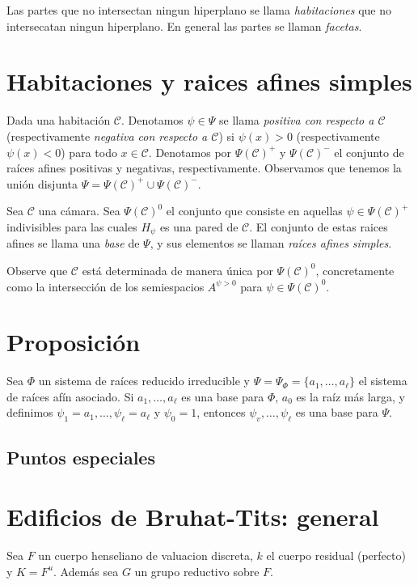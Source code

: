 \documentclass[oneside,12pt]{amsart}
\theoremstyle{definition}
\numberwithin{equation}{section}
\begin{document}
    
    Las partes que no intersectan ningun hiperplano se llama \emph{habitaciones} que no intersecatan ningun hiperplano. En general las partes se llaman \emph{facetas}.


\section{Habitaciones y raices afines simples}

Dada una habitación $\mathcal{C}$. Denotamos $\psi \in \Psi$ se llama \textit{positiva con respecto a $\mathcal C$} (respectivamente \textit{negativa con respecto a $\mathcal C$}) si $\psi(x) > 0$ (respectivamente $\psi(x) < 0$) para todo $x \in \mathcal{C}$. Denotamos por $\Psi(\mathcal{C})^+$ y $\Psi(\mathcal{C})^-$ el conjunto de raíces afines positivas y negativas, respectivamente. Observamos que tenemos la unión disjunta $\Psi = \Psi(\mathcal{C})^+ \cup \Psi(\mathcal{C})^-$.
   
 Sea $\mathcal{C}$ una cámara. Sea $\Psi(\mathcal{C})^0$ el conjunto que consiste en aquellas $\psi \in \Psi(\mathcal{C})^+$ indivisibles para las cuales $H_\psi$ es una pared de $\mathcal{C}$. El conjunto de estas raices afines se llama una \textit{base} de $\Psi$, y sus elementos se llaman \textit{raíces afines simples}.
     
 Observe que $\mathcal{C}$ está determinada de manera única por $\Psi(\mathcal{C})^0$, concretamente como la intersección de los semiespacios $A^{\psi>0}$ para $\psi \in \Psi(\mathcal{C})^0$.


\section{Proposici\'on}
Sea $\Phi$ un sistema de raíces reducido irreducible y $\Psi = \Psi_\Phi=\{a_1, \ldots, a_\ell\}$ el sistema de raíces afín asociado.  Si $a_1, \ldots, a_\ell$ es una base para $\Phi$, $a_0$ es la raíz más larga, y definimos $\psi_1 = 
    a_1, \ldots, \psi_\ell = a_\ell$ y $\psi_0 = 1$, entonces $\psi_v, \ldots, \psi_\ell$ es una base para $\Psi$. 







\subsection{Puntos especiales}



\section{Edificios de Bruhat-Tits: general} Sea $F$ un cuerpo henseliano de valuacion discreta, $k$ el cuerpo residual (perfecto) y $K=F^u$. Adem\'as sea $G$ un grupo reductivo sobre $F$.
\end{document}
